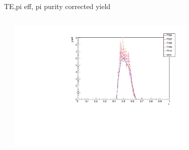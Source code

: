 \begin{frame}{TE,pi eff, pi purity corrected yield}
\begin{columns}
\begin{column}[T]{0.5\textwidth}
\end{column}
\begin{column}[T]{0.5\textwidth}
\includegraphics[width = 0.7\textwidth]{results/yield/check/yieldcheck_470_pos.pdf}
\end{column}
\end{columns}
\end{frame}
